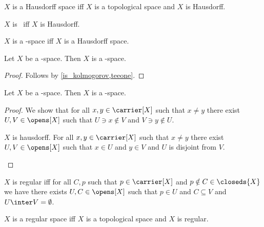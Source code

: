\begin{abbreviation}\label{hausdorff_space}
    $X$ is a Hausdorff space iff $X$ is a topological space and
    $X$ is Hausdorff.
\end{abbreviation}

\begin{abbreviation}\label{teetwo}
    $X$ is \teetwo\ iff $X$ is Hausdorff.
\end{abbreviation}

\begin{abbreviation}\label{teetwo_space}
    $X$ is a \teetwo-space iff $X$ is a Hausdorff space.
\end{abbreviation}

\begin{proposition}\label{teeone_space_is_teezero_space}
    Let $X$ be a \teeone-space.
    Then $X$ is a \teezero-space.
\end{proposition}
\begin{proof}
    Follows by \cref{is_kolmogorov,teeone}.
\end{proof}

\begin{proposition}\label{teetwo_space_is_teeone_space}
    Let $X$ be a \teetwo-space.
    Then $X$ is a \teeone-space.
\end{proposition}
\begin{proof}
    We show that for all $x,y\in\carrier[X]$ such that $x\neq y$
    there exist $U, V\in\opens[X]$ such that
    $U\ni x\notin V$ and $V\ni y\notin U$.
    \begin{subproof}
        $X$ is hausdorff.
        For all $x,y\in\carrier[X]$ such that $x\neq y$
        there exist $U, V\in\opens[X]$ such that
        $x\in U$ and $y\in V$ and $U$ is disjoint from $V$.
    \end{subproof}
\end{proof}

\begin{definition}\label{regular}
    $X$ is regular iff for all $C,p$ such that $p \in \carrier[X]$ and $p \notin C \in \closeds{X}$ we have there exists $U,C \in \opens[X]$ such that $p \in U$ and $C \subseteq V$ and $U \inter V = \emptyset$.
\end{definition}

\begin{definition}\label{regular_space}
    $X$ is a regular space iff $X$ is a topological space and $X$ is regular.
\end{definition}


